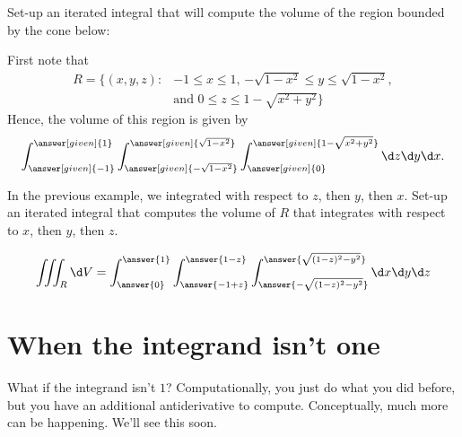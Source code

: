 \documentclass{ximera}
\begin{document}
\begin{example}
  Set-up an iterated integral that will compute the volume of the region
  bounded by the cone below:
  \begin{image}
  \end{image}
  \begin{explanation}
    First note that 
    \begin{align*}
      R=\{(x,y,z):&\text{$-1\leq x\leq 1$, $-\sqrt{1-x^2}\leq y\leq \sqrt{1-x^2}$}, \\
        &\text{and $0\leq z \leq 1-\sqrt{x^2+y^2}$}\}
    \end{align*}
    Hence, the volume of this region is given by
    \[
    \int_{\answer[given]{-1}}^{\answer[given]{1}}
    \int_{\answer[given]{-\sqrt{1-x^2}}}^{\answer[given]{\sqrt{1-x^2}}}
    \int_{\answer[given]{0}}^{\answer[given]{1-\sqrt{x^2+y^2}}}\d z \d y\d x.
    \]
    \end{explanation}
\end{example}

\begin{question}
  In the previous example, we integrated with respect to $z$, then
  $y$, then $x$. Set-up an iterated integral that computes the volume
  of $R$ that integrates with respect to $x$, then $y$, then $z$.
  \begin{prompt}
    \[
    \iiint_R \d V =
    \int_{\answer{0}}^{\answer{1}}
    \int_{\answer{-1+z}}^{\answer{1-z}}
    \int_{\answer{-\sqrt{(1-z)^2-y^2}}}^{\answer{\sqrt{(1-z)^2-y^2}}}
    \d x \d y \d z
    \]
  \end{prompt}
\end{question}

\section{When the integrand isn't one}

What if the integrand isn't $1$? Computationally, you just do what you
did before, but you have an additional antiderivative to
compute. Conceptually, much more can be happening. We'll see this soon.
\end{document}
